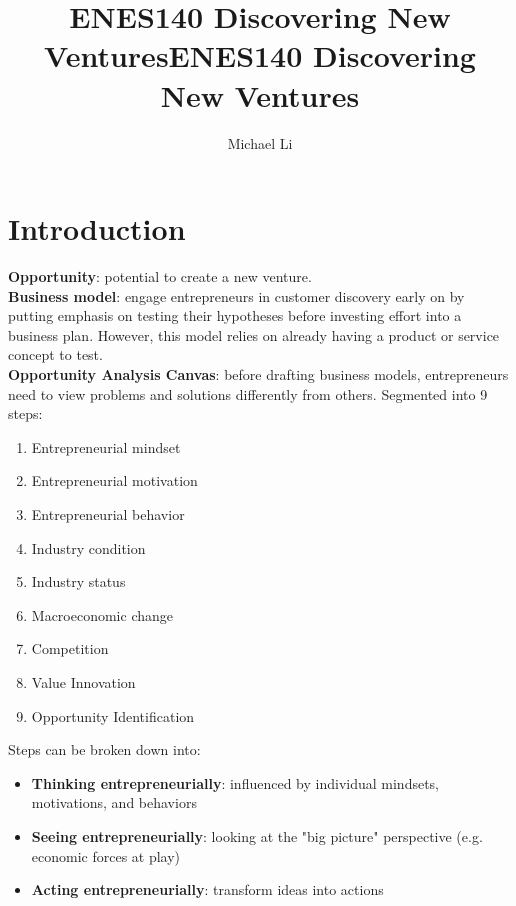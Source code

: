 \documentclass{article}
\date{}
\title{ENES140 Discovering New Ventures}
\begin{document}
 
  \author{Michael Li}
  \title{ENES140 Discovering New Ventures}
  \maketitle
  \tableofcontents
  \newpage
  \section{Introduction}
    \textbf{Opportunity}: potential to create a new venture. \\
    \textbf{Business model}: engage entrepreneurs in customer discovery early on by putting emphasis on testing their hypotheses before investing effort into a business plan. However, this model relies on already having a product or service concept to test. \\
    \textbf{Opportunity Analysis Canvas}: before drafting business models, entrepreneurs need to view problems and solutions differently from others. Segmented into 9 steps:
    \begin{enumerate}
      \item Entrepreneurial mindset
      \item Entrepreneurial motivation
      \item Entrepreneurial behavior
      \item Industry condition
      \item Industry status
      \item Macroeconomic change
      \item Competition
      \item Value Innovation
      \item Opportunity Identification
    \end{enumerate}
    Steps can be broken down into:
    \begin{itemize}
      \item \textbf{Thinking entrepreneurially}: influenced by individual mindsets, motivations, and behaviors
      \item \textbf{Seeing entrepreneurially}: looking at the "big picture" perspective (e.g. economic forces at play)
      \item \textbf{Acting entrepreneurially}: transform ideas into actions
    \end{itemize}
\end{document}
